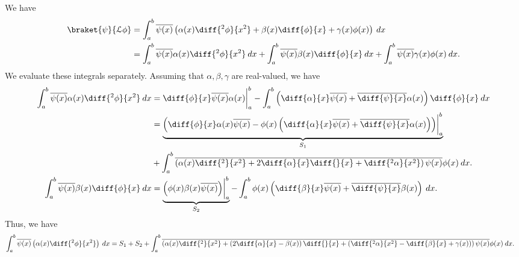 \documentclass[10pt]{mypackage}
\begin{document}
\RaggedRight
\begin{solution}[40.7]
  We have
  \begin{align*}
    \braket{\psi}{\mathcal{L}\phi} &= \int_{a}^{b} \overline{\psi(x)}\left( \alpha(x)\diff{^2\phi}{x^2} + \beta(x)\diff{\phi}{x} + \gamma(x)\phi(x) \right)\:dx\\
                                   &= \int_{a}^{b} \overline{\psi(x)}\alpha(x)\diff{^2\phi}{x^2}\:dx + \int_{a}^{b} \overline{\psi(x)}\beta(x)\diff{\phi}{x}\:dx + \int_{a}^{b} \overline{\psi(x)}\gamma(x)\phi(x)\:dx.
  \end{align*}
  We evaluate these integrals separately. Assuming that $\alpha,\beta,\gamma$ are real-valued, we have
  \begin{align*}
    \int_{a}^{b} \overline{\psi(x)}\alpha(x)\diff{^2\phi}{x^2}\:dx &= \diff{\phi}{x} \overline{\psi(x)}\alpha(x)\biggr\vert_{a}^{b} - \int_{a}^{b} \left( \diff{\alpha}{x} \overline{\psi(x)} + \overline{\diff{\psi}{x}} \alpha(x) \right)\diff{\phi}{x}\:dx\\
                                                                   &= \underbrace{\left( \diff{\phi}{x}\alpha(x) \overline{\psi(x)} - \phi(x)\left( \diff{\alpha}{x} \overline{\psi(x)} + \overline{\diff{\psi}{x}} \alpha(x) \right) \right) \biggr\vert_{a}^{b}}_{S_1}\\
                                                                   &+ \int_{a}^{b} \overline{\left( \alpha(x)\diff{^2}{x^2} + 2\diff{\alpha}{x}\diff{}{x} + \diff{^2\alpha}{x^2}\right)\psi(x)}\phi(x)\:dx.\\
    \int_{a}^{b} \overline{\psi(x)}\beta(x) \diff{\phi}{x}\:dx &= \underbrace{\left( \phi(x) \beta(x) \overline{\psi(x)} \right)\biggr\vert_{a}^{b}}_{S_2} - \int_{a}^{b} \phi(x)\left( \diff{\beta}{x} \overline{\psi(x)} + \overline{\diff{\psi}{x}} \beta(x) \right)\:dx.
  \end{align*}
  Thus, we have
  \begin{align*}
    \int_{a}^{b} \overline{\psi(x)} \left( \alpha(x)\diff{^2\phi}{x^2} \right)\:dx &= S_1 + S_2 + \int_{a}^{b} \overline{\left( \alpha(x)\diff{^2}{x^2} + \left( 2\diff{\alpha}{x}-\beta(x) \right)\diff{}{x} + \left( \diff{^2\alpha}{x^2} - \diff{\beta}{x} + \gamma(x) \right) \right)\psi(x)} \phi(x)\:dx.
  \end{align*}
\end{solution}
\end{document}
